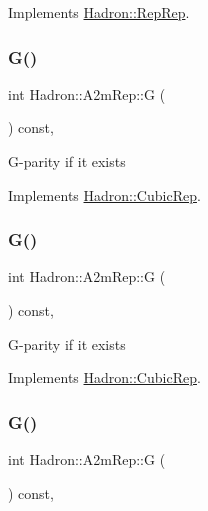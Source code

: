 Implements \mbox{\hyperlink{structHadron_1_1RepRep_a92c8802e5ed7afd7da43ccfd5b7cd92b}{Hadron\+::\+Rep\+Rep}}.

\mbox{\label{structHadron_1_1A2mRep_a1792c6f3d21c43c796544e2f8113630a}} 
\subsubsection{\texorpdfstring{G()}{G()}\hspace{0.1cm}{\footnotesize\ttfamily [1/3]}}
{\footnotesize\ttfamily int Hadron\+::\+A2m\+Rep\+::G (\begin{DoxyParamCaption}{ }\end{DoxyParamCaption}) const\hspace{0.3cm}{\ttfamily [inline]}, {\ttfamily [virtual]}}

G-\/parity if it exists 

Implements \mbox{\hyperlink{structHadron_1_1CubicRep_a52104e43266d1614c00bbd1c3b395458}{Hadron\+::\+Cubic\+Rep}}.

\mbox{\label{structHadron_1_1A2mRep_a1792c6f3d21c43c796544e2f8113630a}} 
\subsubsection{\texorpdfstring{G()}{G()}\hspace{0.1cm}{\footnotesize\ttfamily [2/3]}}
{\footnotesize\ttfamily int Hadron\+::\+A2m\+Rep\+::G (\begin{DoxyParamCaption}{ }\end{DoxyParamCaption}) const\hspace{0.3cm}{\ttfamily [inline]}, {\ttfamily [virtual]}}

G-\/parity if it exists 

Implements \mbox{\hyperlink{structHadron_1_1CubicRep_a52104e43266d1614c00bbd1c3b395458}{Hadron\+::\+Cubic\+Rep}}.

\mbox{\label{structHadron_1_1A2mRep_a1792c6f3d21c43c796544e2f8113630a}} 
\subsubsection{\texorpdfstring{G()}{G()}\hspace{0.1cm}{\footnotesize\ttfamily [3/3]}}
{\footnotesize\ttfamily int Hadron\+::\+A2m\+Rep\+::G (\begin{DoxyParamCaption}{ }\end{DoxyParamCaption}) const\hspace{0.3cm}{\ttfamily [inline]}, {\ttfamily [virtual]}}

